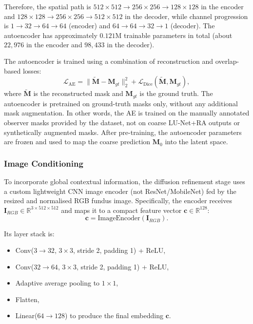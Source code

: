 \documentclass[journal,article,submit,pdftex,moreauthors]{Definitions/mdpi}
\begin{document}
Therefore, the spatial path is $512\times512\rightarrow256\times256\rightarrow128\times128$ in the encoder and $128\times128\rightarrow256\times256\rightarrow512\times512$ in the decoder, while channel progression is $1\rightarrow32\rightarrow64\rightarrow64$ (encoder) and $64\rightarrow64\rightarrow32\rightarrow1$ (decoder). The autoencoder has approximately $0.121$M trainable parameters in total (about $22{,}976$ in the encoder and $98{,}433$ in the decoder).

The autoencoder is trained using a combination of reconstruction and overlap-based losses:
\begin{equation}
\mathcal{L}_{\text{AE}} =
\|\tilde{\mathbf{M}}-\mathbf{M}_{gt}\|_2^2 +
\mathcal{L}_{\text{Dice}}(\tilde{\mathbf{M}},\mathbf{M}_{gt}),
\end{equation}
where $\tilde{\mathbf{M}}$ is the reconstructed mask and $\mathbf{M}_{gt}$ is the ground truth. The autoencoder is pretrained on ground-truth masks only, without any additional mask augmentation. In other words, the AE is trained on the manually annotated observer masks provided by the dataset, not on coarse LU-Net+RA outputs or synthetically augmented masks. After pre-training, the autoencoder parameters are frozen and used to map the coarse prediction $\mathbf{M}_0$ into the latent space.

\subsubsection{Image Conditioning}

To incorporate global contextual information, the diffusion refinement stage uses a custom lightweight CNN image encoder (not ResNet/MobileNet) fed by the resized and normalised RGB fundus image. Specifically, the encoder receives $\mathbf{I}_{RGB}\in\mathbb{R}^{3\times512\times512}$ and maps it to a compact feature vector $\mathbf{c}\in\mathbb{R}^{128}$:
\begin{equation}
\mathbf{c}=\mathrm{ImageEncoder}(\mathbf{I}_{RGB}).
\end{equation}

Its layer stack is:
\begin{itemize}
  \item Conv($3\rightarrow32$, $3\times3$, stride 2, padding 1) + ReLU,
  \item Conv($32\rightarrow64$, $3\times3$, stride 2, padding 1) + ReLU,
  \item Adaptive average pooling to $1\times1$,
  \item Flatten,
  \item Linear($64\rightarrow128$) to produce the final embedding $\mathbf{c}$.
\end{itemize}
\end{document}
